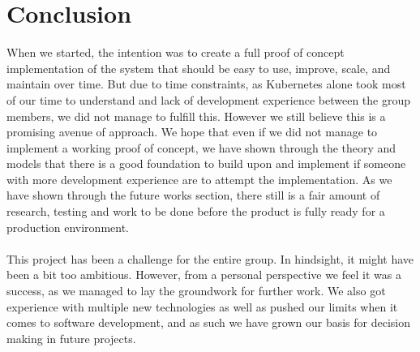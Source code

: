 \documentclass[../main.tex]{subfiles}
\begin{document}
\renewcommand{\baselinestretch}{1.5}
\chapter{Conclusion}




When we started, the intention was to create a full proof of concept implementation of the system that should be easy to use, improve, scale, and maintain over time. But due to time constraints, as Kubernetes alone took most of our time to understand and lack of development experience between the group members, we did not manage to fulfill this. However we still believe this is a promising avenue of approach. We hope that even if we did not manage to implement a working proof of concept, we have shown through the theory and models that there is a good foundation to build upon and implement if someone with more development experience are to attempt the implementation. As we have shown through the future works section, there still is a fair amount of research, testing and work to be done before the product is fully ready for a production environment.\\\\

This project has been a challenge for the entire group. In hindsight, it might have been a bit too ambitious. However, from a personal perspective we feel it was a success, as we managed to lay the groundwork for further work. We also got experience with multiple new technologies as well as pushed our limits when it comes to software development, and as such we have grown our basis for decision making in future projects.
\end{document}
